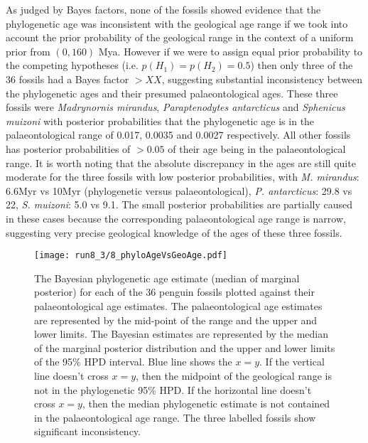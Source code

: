 \documentclass[11pt]{article}
\begin{document}
As judged by Bayes factors, none of the fossils showed evidence that the phylogenetic age was inconsistent with the geological age range if we took into account the prior probability of the geological range in the context of a uniform prior from $(0,160)$ Mya. However if we were to assign equal prior probability to the competing hypotheses (i.e. $p(H_1) = p(H_2) = 0.5$) then only three of the 36 fossils had a Bayes factor $> XX$, suggesting substantial inconsistency between the phylogenetic ages and their presumed palaeontological ages. These three fossils were {\em Madrynornis mirandus}, {\em Paraptenodytes antarcticus} and {\em Sphenicus muizoni} with posterior probabilities that the phylogenetic age is in the palaeontological range of 0.017, 0.0035 and 0.0027 respectively. All other fossils has posterior probabilities of $> 0.05$ of their age being in the palaeontological range. It is worth noting that the absolute discrepancy in the ages are still quite moderate for the three fossils with low posterior probabilities, with {\em M. mirandus}: 6.6Myr vs 10Myr (phylogenetic versus palaeontological), {\em P. antarcticus}: 29.8 vs 22, {\em S. muizoni}: 5.0 vs 9.1. The small posterior probabilities are partially caused in these cases because the corresponding palaeontological age range is narrow, suggesting very precise geological knowledge of the ages of these three fossils.

\begin{figure}
\texttt{[image: run8\_3/8\_phyloAgeVsGeoAge.pdf]}
\caption{\label{fig:phyloAgeVsGeoAge}
The Bayesian phylogenetic age estimate (median of marginal posterior) for each of the 36 penguin fossils plotted against their palaeontological age estimates. The palaeontological age estimates are represented by the mid-point of the range and the upper and lower limits. The Bayesian estimates are represented by the median of the marginal posterior distribution and the upper and lower limits of the 95\% HPD interval. Blue line shows the $x=y$. If the vertical line doesn't cross $x=y$, then the midpoint of the geological range is not in the phylogenetic 95\% HPD. If the horizontal line doesn't cross $x=y$, then the median phylogenetic estimate is not contained in the palaeontological age range. The three labelled fossils show significant inconsistency.}
\end{figure}

\begin{figure}
\end{figure}
\end{document}
